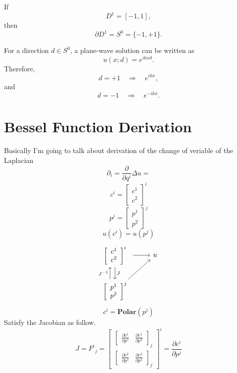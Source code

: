 If
\[
    D^1=[-1,1],
\]
then
\[
    \partial D^1=S^0=\{-1,+1\}.
\]

For a direction $d\in S^0$, a plane-wave solution can be written as
\[
    u(x;d)=e^{ikxd}.
\]
Therefore,
\[
    d=+1 \quad\Longrightarrow\quad e^{ikx},
\]
and
\[
    d=-1 \quad\Longrightarrow\quad e^{-ikx}.
\]





\section{Bessel Function Derivation}
Basically I'm going to talk about
derivation of the change of veriable of the Laplacian
\[
    \partial_i=\frac{\partial}{\partial q^i}
    \Delta u=
\]
\[
    c^i=
    \left[\begin{array}{c}
            c^1
            \\
            c^2
        \end{array}\right]^{i}
\]
\[
    p^j=
    \left[\begin{array}{c}
            p^1
            \\
            p^2
        \end{array}\right]^{j}
\]
\[
    u(c^i)=u(p^j)
\]
\[\begin{tikzcd}
        \begin{array}{c}     \left[\begin{array}{c}             c^1             \\             c^2         \end{array}\right]^{i}  \end{array} & u \\
        \begin{array}{c}     \left[\begin{array}{c}             p^1             \\             p^2         \end{array}\right]^{j} \end{array}
        \arrow[from=1-1, to=1-2]
        \arrow["J", from=1-1, to=2-1]
        \arrow["{J^{-1}}", shift left=3, from=2-1, to=1-1]
        \arrow[from=2-1, to=1-2]
    \end{tikzcd}\]
\[
    c^i=\textbf{Polar}(p^j)
\]
Satisfy the Jacobian as follow.
\[
    J=F^i{}_j{}=
    \left[\begin{array}{cc}
            \left[\begin{array}{ll}
                          \frac{\partial c^1}{\partial p^1}
                           &
                          \frac{\partial c^1}{\partial p^2}
                      \end{array}\right]_{j}
            \\
            \left[\begin{array}{ll}
                          \frac{\partial c^2}{\partial p^1}
                           &
                          \frac{\partial c^2}{\partial p^2}
                      \end{array}\right]_{j}
        \end{array}\right]^{i}
    =\frac{\partial c^i}{\partial p^j}
\]

